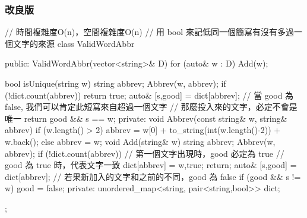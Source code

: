 \subsubsection{改良版}
\begin{Code}
// 時間複雜度O(n)，空間複雜度O(n)
// 用 bool 來記低同一個簡寫有沒有多過一個文字的來源
class ValidWordAbbr {
public:
    ValidWordAbbr(vector<string>& D) {
        for (auto& w : D) {
            Add(w);
        }
    }

    bool isUnique(string w) {
        string abbrev;
        Abbrev(w, abbrev);
        if (!dict.count(abbrev)) return true;
        auto& [s,good] = dict[abbrev];
        // 當 good 為 false, 我們可以肯定此短寫來自超過一個文字
        // 那麼投入來的文字，必定不會是唯一
        return good && s == w;
    }
private:
    void Abbrev(const string& w, string& abbrev) {
        if (w.length() > 2){
            abbrev = w[0] + to_string(int(w.length()-2)) + w.back();
        } else {
            abbrev = w;
        }
    }
    void Add(string& w) {
        string abbrev;
        Abbrev(w, abbrev);
        if (!dict.count(abbrev)) {
            // 第一個文字出現時，good 必定為 true
            // good 為 true 時，代表文字一致
            dict[abbrev] = {w,true};
            return;
        }
        auto& [s,good] = dict[abbrev];
        // 若果新加入的文字和之前的不同，good 為 false
        if (good && s != w) good = false;
    }
private:
    unordered_map<string, pair<string,bool>> dict;
};
\end{Code}
